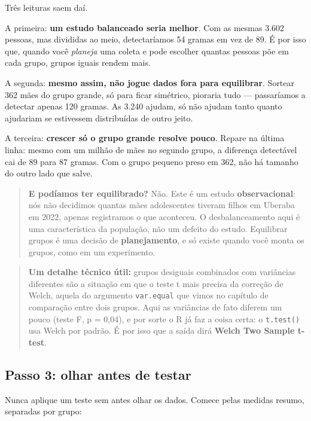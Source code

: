 \documentclass[
]{book}
\begin{document}
Três leituras saem daí.

A primeira: \textbf{um estudo balanceado seria melhor}. Com as mesmas 3.602 pessoas, mas divididas ao meio, detectaríamos 54 gramas em vez de 89. É por isso que, quando você \emph{planeja} uma coleta e pode escolher quantas pessoas põe em cada grupo, grupos iguais rendem mais.

A segunda: \textbf{mesmo assim, não jogue dados fora para equilibrar}. Sortear 362 mães do grupo grande, só para ficar simétrico, pioraria tudo --- passaríamos a detectar apenas 120 gramas. As 3.240 ajudam, só não ajudam tanto quanto ajudariam se estivessem distribuídas de outro jeito.

A terceira: \textbf{crescer só o grupo grande resolve pouco}. Repare na última linha: mesmo com um milhão de mães no segundo grupo, a diferença detectável cai de 89 para 87 gramas. Com o grupo pequeno preso em 362, não há tamanho do outro lado que salve.

\begin{quote}
\textbf{E podíamos ter equilibrado?} Não. Este é um estudo \textbf{observacional}: nós não decidimos quantas mães adolescentes tiveram filhos em Uberaba em 2022, apenas registramos o que aconteceu. O desbalanceamento aqui é uma característica da população, não um defeito do estudo. Equilibrar grupos é uma decisão de \textbf{planejamento}, e só existe quando você monta os grupos, como em um experimento.
\end{quote}

\begin{quote}
\textbf{Um detalhe técnico útil:} grupos desiguais combinados com variâncias diferentes são a situação em que o teste t mais precisa da correção de Welch, aquela do argumento \texttt{var.equal} que vimos no capítulo de comparação entre dois grupos. Aqui as variâncias de fato diferem um pouco (teste F, p = 0,04), e por sorte o R já faz a coisa certa: o \texttt{t.test()} usa Welch por padrão. É por isso que a saída dirá \textbf{Welch Two Sample t-test}.
\end{quote}

\subsection{Passo 3: olhar antes de testar}\label{passo-3-olhar-antes-de-testar}

Nunca aplique um teste sem antes olhar os dados. Comece pelas medidas resumo, separadas por grupo:
\end{document}
